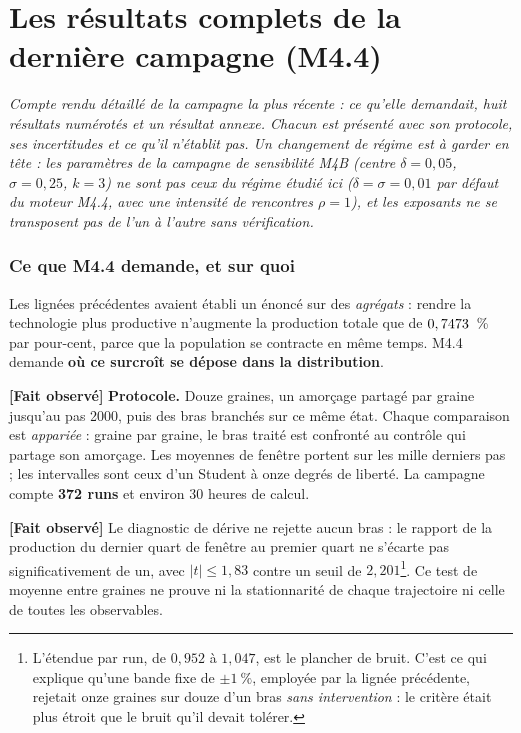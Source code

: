 \documentclass[11pt,a4paper]{article}
\newcommand{\fait}{\textbf{[Fait observé]}}
\begin{document}
\clearpage

\part{Les résultats complets de la dernière campagne (M4.4)}
\label{part:m44}

\emph{Compte rendu détaillé de la campagne la plus récente : ce qu'elle demandait,
huit résultats numérotés et un résultat annexe. Chacun est présenté avec son
protocole, ses incertitudes et ce qu'il n'établit pas. Un changement de régime est à
garder en tête : les paramètres de la campagne de sensibilité M4B (centre
$\delta=0{,}05$, $\sigma=0{,}25$, $k=3$) ne sont pas ceux du régime étudié ici
($\delta=\sigma=0{,}01$ par défaut du moteur M4.4, avec une intensité de rencontres
$\rho=1$), et les exposants ne se transposent pas de l'un à l'autre sans vérification.}

\section{Ce que M4.4 demande, et sur quoi}

Les lignées précédentes avaient établi un énoncé sur des \emph{agrégats} :
rendre la technologie plus productive n'augmente la production totale que de
$0,7473$~\% par pour-cent, parce que la population se contracte en même
temps. M4.4 demande \textbf{où ce surcroît se dépose dans la distribution}.

\fait{} \textbf{Protocole.} Douze graines, un amorçage partagé par graine
jusqu'au pas 2000, puis des bras branchés sur ce même état. Chaque comparaison
est \emph{appariée} : graine par graine, le bras traité est confronté au
contrôle qui partage son amorçage. Les moyennes de fenêtre portent sur les mille
derniers pas ; les intervalles sont ceux d'un Student à onze degrés de liberté.
La campagne compte \textbf{372 runs} et environ 30 heures de calcul.

\fait{} Le diagnostic de dérive ne rejette aucun bras : le rapport de la
production du dernier quart de fenêtre au premier quart ne s'écarte pas
significativement de un, avec $|t| \le 1{,}83$ contre un seuil de
$2{,}201$\footnote{L'étendue par run, de $0{,}952$ à $1{,}047$, est le plancher
de bruit. C'est ce qui explique qu'une bande fixe de $\pm 1~\%$, employée par la
lignée précédente, rejetait onze graines sur douze d'un bras \emph{sans
intervention} : le critère était plus étroit que le bruit qu'il devait tolérer.}.
Ce test de moyenne entre graines ne prouve ni la stationnarité de chaque
trajectoire ni celle de toutes les observables.
\end{document}
